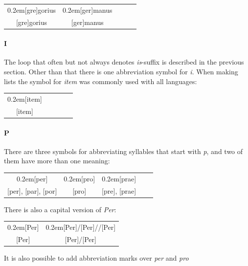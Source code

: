 \documentclass[a4paper]{article}
\newcommand{\samplefont}{\fontsize{16}{16}\abcursivefamily\spaceskip0.2em}
\newcommand{\sample}[1]{{\samplefont #1 \strut}}
\newcommand{\abred}[1]{{\addfontfeature{Color=B1523E}#1}}
\newcommand{\abdarkred}[1]{{\addfontfeature{Color=4D231C}#1}}
\begin{document}
\begin{center}
  \begin{tabular}{ccccc}
    \sample{[gre]gorius} & \sample{[ger]manus} \\
    {}[gre]gorius & [ger]manus 
  \end{tabular}
\end{center}

\paragraph{I}

The loop that often but not always denotes \emph{is}-suffix is
described in the previous section. Other than that there is one
abbreviation symbol for \emph{i}. When making lists the symbol for
\emph{item} was commonly used with all languages:
\begin{center}
  \begin{tabular}{ccccc}
    \sample{[item]} \\
    {}[item]
  \end{tabular}
\end{center}

\paragraph{P}

There are three symbols for abbreviating syllables that start with
\emph{p}, and two of them have more than one meaning:

\begin{center}
  \begin{tabular}{ccccc}
    \sample{[per]} & \sample{[pro]} & \sample{[prae]} \\
    {}[per], [par], [por] & [pro] & [pre], [prae] 
  \end{tabular}
\end{center}

There is also a capital version of \emph{Per}:

\begin{center}
  \begin{tabular}{cc}
    \sample{[Per]} & \sample{[Per]\abred{/[Per]}\abdarkred{//[Per]}} \\
    {}[Per] & [Per]{\color{abred}/[Per]}{\color{abdarkred}{//[Per]}}
  \end{tabular}
\end{center}
% 

It is also possible to add abbreviation marks over \emph{per} and
\emph{pro}
\end{document}
